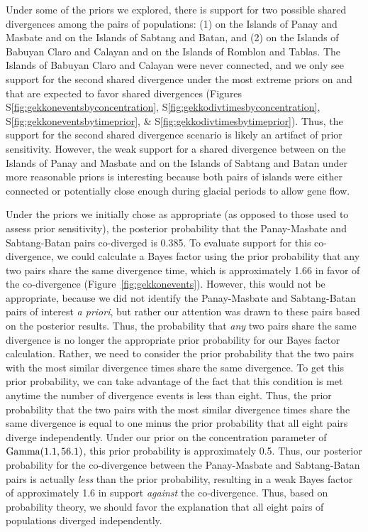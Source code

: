 Under some of the priors we explored, there is support for two possible shared
divergences among the pairs of  populations:
(1)
 on the Islands of Panay and Masbate
and
 on the Islands of Sabtang and Batan,
and (2)
 on the Islands of Babuyan Claro and Calayan
and
 on the Islands of Romblon and Tablas.
The Islands of Babuyan Claro and Calayan were never connected,
and we only see support for the second shared divergence
under the most extreme priors on \concentration and
\divtime that are expected to favor shared divergences
(Figures
S\ref{fig:gekkoneventsbyconcentration},
S\ref{fig:gekkodivtimesbyconcentration},
S\ref{fig:gekkoneventsbytimeprior},
\&
S\ref{fig:gekkodivtimesbytimeprior}).
Thus, the support for the second shared divergence scenario is likely an
artifact of prior sensitivity.
However, the weak support for a shared divergence between
 on the Islands of Panay and Masbate
and
 on the Islands of Sabtang and Batan
under more reasonable priors is interesting because both pairs of islands were
either connected or potentially close enough during glacial periods to allow
gene flow.

Under the priors we initially chose as appropriate (as opposed to those used to
assess prior sensitivity), the posterior probability that the Panay-Masbate and
Sabtang-Batan pairs co-diverged is 0.385.
To evaluate support for this co-divergence, we could calculate a Bayes factor
using the prior probability that any two pairs share the same divergence time,
which is approximately 1.66 in favor of the co-divergence
(Figure~\ref{fig:gekkonevents}).
However, this would not be appropriate, because we did not identify the
Panay-Masbate and Sabtang-Batan pairs of interest \emph{a priori},
but rather our attention was drawn to these pairs based on the posterior
results.
Thus, the probability that \emph{any} two pairs share the same divergence
is no longer the appropriate prior probability for our Bayes factor calculation.
Rather, we need to consider the prior probability that the two pairs with
the most similar divergence times share the same divergence.
To get this prior probability, we can take advantage of the fact that this
condition is met anytime the number of divergence events is less than eight.
Thus, the prior probability that the two pairs with the most similar divergence
times share the same divergence is equal to one minus the prior probability
that all eight pairs diverge independently.
Under our prior on the concentration parameter of $\textrm{Gamma}(1.1, 56.1)$,
this prior probability is approximately 0.5.
Thus, our posterior probability for the co-divergence between the Panay-Masbate
and Sabtang-Batan pairs is actually \emph{less} than the prior probability,
resulting in a weak Bayes factor of approximately 1.6 in support \emph{against}
the co-divergence.
Thus, based on probability theory, we should favor the explanation that all
eight pairs of  populations diverged independently.

